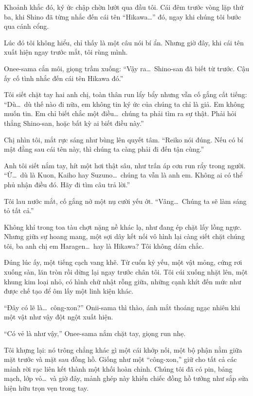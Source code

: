 \documentclass[../main.tex]{subfiles}
\begin{document}
Khoảnh khắc đó, ký ức chập chờn lướt qua đầu tôi. Cái đêm trước vòng lặp thứ ba, khi Shino đã từng nhắc đến cái tên ``Hikawa\dots'' đó, ngay khi chúng tôi bước qua cánh cổng.

Lúc đó tôi không hiểu, chỉ thấy là một câu nói bí ẩn. Nhưng giờ đây, khi cái tên xuất hiện ngay trước mắt, tôi rùng mình.

Onee-sama cắn môi, giọng trầm xuống: ``Vậy ra\dots\ Shino-san đã biết từ trước. Cậu ấy cố tình nhắc đến cái tên Hikawa đó.''

Tôi siết chặt tay hai anh chị, toàn thân run lẩy bẩy nhưng vẫn cố gắng cất tiếng: ``Dù\dots\ dù thế nào đi nữa, em không tin ký ức của chúng ta chỉ là giả. Em không muốn tin. Em chỉ biết chắc một điều\dots\ chúng ta phải tìm ra sự thật. Phải hỏi thẳng Shino-san, hoặc bất kỳ ai biết điều này.''

Chị nhìn tôi, mắt rực sáng như bùng lên quyết tâm. ``Reiko nói đúng. Nếu có bí mật đằng sau cái tên này, thì chúng ta càng phải đi đến tận cùng.''

Anh tôi siết nắm tay, hít một hơi thật sâu, như trấn áp cơn run rẩy trong người. ``Ừ\dots\ dù là Kuon, Kaiho hay Suzuno\dots\ chúng ta vẫn là anh em. Không ai có thể phủ nhận điều đó. Hãy đi tìm câu trả lời.''

Tôi lau nước mắt, cố gắng nở một nụ cười yếu ớt. ``Vâng\dots\ Chúng ta sẽ làm sáng tỏ tất cả.''

Không khí trong toa tàu chợt nặng nề khác lạ, như đang ép chặt lấy lồng ngực. Nhưng giữa sự hoang mang, một sợi dây kết nối vô hình lại càng siết chặt chúng tôi, ba anh chị em Haragen\dots\ hay là Hikawa? Tôi không dám chắc.

Đúng lúc ấy, một tiếng cạch vang khẽ. Từ cuốn kỷ yếu, một vật mỏng, cứng rơi xuống sàn, lăn tròn rồi dừng lại ngay trước chân tôi. Tôi cúi xuống nhặt lên, một khung kim loại nhỏ, có hình chữ nhật rỗng giữa, những cạnh khít đến mức như được chế tạo để ôm lấy một linh kiện khác.

``Đây có lẽ là\dots\ công-xon?'' Onii-sama thì thào, ánh mắt thoáng ngạc nhiên khi một vật như vậy đột ngột xuất hiện.

``Có vẻ là như vậy,'' Onee-sama nắm chặt tay, giọng run nhẹ.

Tôi khựng lại: nó trông chẳng khác gì một cái khớp nối, một bộ phận nằm giữa mặt trước và mặt sau đồng hồ. Giống như một ``công-xon,'' giữ cho tất cả các mảnh rời rạc liên kết thành một khối hoàn chỉnh. Chúng tôi đã có pin, bảng mạch, lớp vỏ\dots\ và giờ đây, mảnh ghép này khiến chiếc đồng hồ tưởng như sắp sửa hiện hữu trọn vẹn trong tay.
\end{document}

